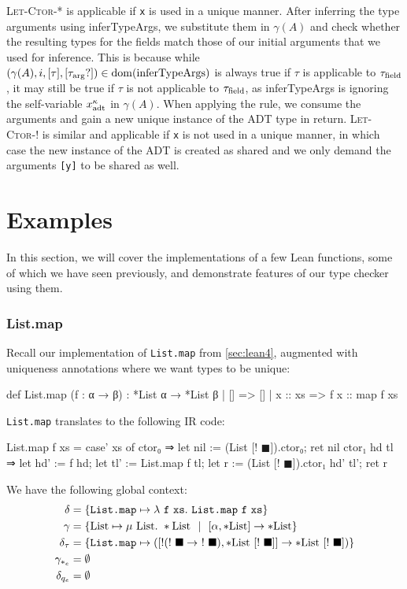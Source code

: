\textsc{Let-Ctor-*} is applicable if \texttt{x} is used in a unique manner. After inferring the type arguments using inferTypeArgs, we substitute them in $\gamma(A)$ and check whether the resulting types for the fields match those of our initial arguments that we used for inference. This is because while $(\gamma(A), i, [\tau], [\tau_{\mathrm{arg}}?]) \in \mathrm{dom}(\mathrm{inferTypeArgs})$ is always true if $\tau$ is applicable to $\tau_{\mathrm{field}}$, it may still be true if $\tau$ is not applicable to $\tau_{\mathrm{field}}$, as inferTypeArgs is ignoring the self-variable $x_{\mathrm{adt}}^\kappa$ in $\gamma(A)$. When applying the rule, we consume the arguments and gain a new unique instance of the ADT type in return. \textsc{Let-Ctor-!} is similar and applicable if \texttt{x} is not used in a unique manner, in which case the new instance of the ADT is created as shared and we only demand the arguments \texttt{[y]} to be shared as well.

\section{Examples}\label{sec:examples}
In this section, we will cover the implementations of a few Lean functions, some of which we have seen previously, and demonstrate features of our type checker using them.

\subsubsection{List.map}
Recall our implementation of \lstinline|List.map| from \cref{sec:lean4}, augmented with uniqueness annotations where we want types to be unique:\\
\begin{code}
def List.map (f : α → β) : *List α → *List β
  | []      => []
  | x :: xs => f x :: map f xs
\end{code}
\lstinline|List.map| translates to the following IR code:\\
\begin{ifcode}
List.map f xs = case' xs of
  ctor₀ ⇒
    let nil := (List [! $\blacksquare$]).ctor₀;
    ret nil
  ctor₁ hd tl ⇒
    let hd' := f hd;
    let tl' := List.map f tl;
    let r := (List [! $\blacksquare$]).ctor₁ hd' tl';
    ret r
\end{ifcode}

We have the following global context:
\begin{align*}
	\delta &= \{\texttt{List.map} \mapsto \lambda\ \texttt{f}\ \texttt{xs}.\ \texttt{List.map}\ \texttt{f}\ \texttt{xs}\} \\
	\gamma &= \{\List \mapsto \mu\ \List.\ *\List \sep [\alpha, *\List] \to *\List\} \\
	\delta_\tau &= \{\texttt{List.map} \mapsto ([!(!\ \blacksquare \to\ !\ \blacksquare), *\List\ [!\ \blacksquare]] \to *\List\ [!\ \blacksquare])\} \\
	\gamma_{*_e} &= \emptyset \\
	\delta_{q_e} &= \emptyset
\end{align*}

